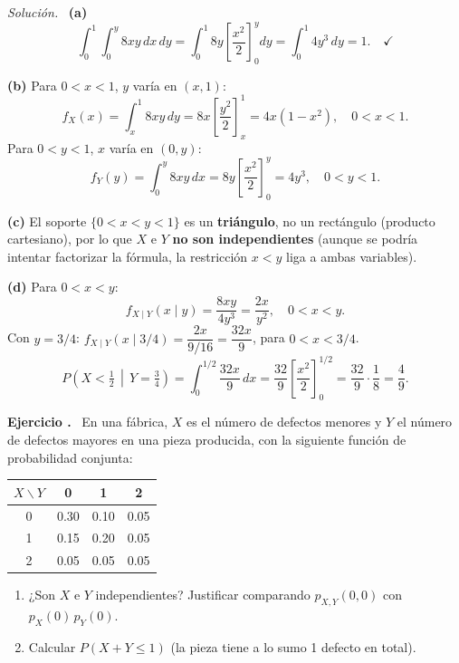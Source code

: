 \documentclass[11pt,a4paper]{article}
\newcounter{ejnum}
\newenvironment{ejercicio}{\refstepcounter{ejnum}\par\medskip\noindent\textbf{Ejercicio \theejnum.}~}{\par}
\newenvironment{solucion}{\par\noindent\textit{Solución.}~}{\par\vspace{1em}}
\begin{document}
\begin{solucion}
\textbf{(a)}
\[
\int_0^1\int_0^y 8xy\,dx\,dy = \int_0^1 8y\left[\frac{x^2}{2}\right]_0^y dy = \int_0^1 4y^3\,dy = 1. \quad\checkmark
\]

\textbf{(b)} Para $0<x<1$, $y$ varía en $(x,1)$:
\[
f_X(x) = \int_x^1 8xy\,dy = 8x\left[\frac{y^2}{2}\right]_x^1 = 4x(1-x^2), \quad 0<x<1.
\]
Para $0<y<1$, $x$ varía en $(0,y)$:
\[
f_Y(y) = \int_0^y 8xy\,dx = 8y\left[\frac{x^2}{2}\right]_0^y = 4y^3, \quad 0<y<1.
\]

\textbf{(c)} El soporte $\{0<x<y<1\}$ es un \textbf{triángulo}, no un rectángulo (producto cartesiano), por lo que $X$ e $Y$ \textbf{no son independientes} (aunque se podría intentar factorizar la fórmula, la restricción $x<y$ liga a ambas variables).

\textbf{(d)} Para $0<x<y$:
\[
f_{X\mid Y}(x\mid y) = \frac{8xy}{4y^3} = \frac{2x}{y^2}, \quad 0<x<y.
\]
Con $y=3/4$: $f_{X\mid Y}(x\mid 3/4) = \dfrac{2x}{9/16} = \dfrac{32x}{9}$, para $0<x<3/4$.
\[
P\left(X<\tfrac12 \,\middle|\, Y=\tfrac34\right) = \int_0^{1/2} \frac{32x}{9}\,dx = \frac{32}{9}\left[\frac{x^2}{2}\right]_0^{1/2} = \frac{32}{9}\cdot\frac18 = \frac{4}{9}.
\]
\end{solucion}

\begin{ejercicio}
En una fábrica, $X$ es el número de defectos menores y $Y$ el número de defectos mayores en una pieza producida, con la siguiente función de probabilidad conjunta:

\begin{center}
\begin{tabular}{c|ccc}
\toprule
$X\backslash Y$ & 0 & 1 & 2 \\
\midrule
0 & 0.30 & 0.10 & 0.05 \\
1 & 0.15 & 0.20 & 0.05 \\
2 & 0.05 & 0.05 & 0.05 \\
\bottomrule
\end{tabular}
\end{center}

\begin{enumerate}[label=(\alph*)]
\item ¿Son $X$ e $Y$ independientes? Justificar comparando $p_{X,Y}(0,0)$ con $p_X(0)\,p_Y(0)$.
\item Calcular $P(X+Y\le 1)$ (la pieza tiene a lo sumo 1 defecto en total).
\end{enumerate}
\end{ejercicio}
\end{document}
